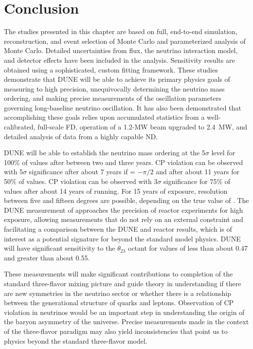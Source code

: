 \section{Conclusion}
\label{sec:physics-lbnosc-conclude}

The studies presented in this chapter are based on full, end-to-end simulation, reconstruction, and event selection of  Monte Carlo and parameterized analysis of  Monte Carlo. Detailed uncertainties from flux, the neutrino interaction model, and detector effects have been included in the analysis. Sensitivity results are obtained using a sophisticated, custom fitting framework. These studies demonstrate that DUNE will be able to achieve its primary physics goals of measuring \deltacp to high precision, unequivocally determining the neutrino mass ordering, and making precise measurements of the oscillation parameters governing long-baseline neutrino oscillation. It has also been demonstrated that accomplishing these goals relies upon accumulated statistics from a well-calibrated, full-scale FD,  operation of a 1.2-MW beam upgraded to 2.4~MW, and detailed analysis of data from a highly capable ND.

DUNE will be able to establish the neutrino mass ordering at the 5$\sigma$ level for 100\% of \deltacp values after between two and three years. CP violation can be observed with 5$\sigma$ significance after about 7 years if \deltacp = $-\pi/2$ and after about 11 years for 50\% of \deltacp values. CP violation can be observed with 3$\sigma$ significance for 75\% of \deltacp values after about 14 years of running. For 15 years of exposure, \deltacp resolution between five and fifteen degrees are possible, depending on the true value of \deltacp. The DUNE measurement of  approaches the precision of reactor experiments for high exposure, allowing measurements that do not rely on an external  constraint and facilitating a comparison between the DUNE and reactor   results, which is of interest as a potential signature for beyond the standard model physics. DUNE will have significant sensitivity to the $\theta_{23}$ octant for values of  less than about 0.47 and greater than about 0.55.

These measurements will make significant contributions to completion of the standard three-flavor 
mixing picture and guide theory in understanding if there are new symmetries in the neutrino sector or whether there is a relationship between the generational structure of quarks and leptons. Observation of CP violation in neutrinos would be an important step in understanding the origin of the baryon asymmetry of the universe. Precise measurements made in the context of the three-flavor paradigm may also yield inconsistencies that point us to physics beyond the standard three-flavor model. 